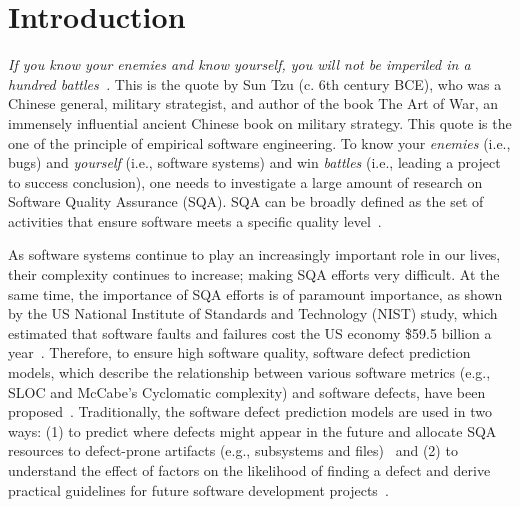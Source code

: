 \section{Introduction}

\emph{If you know your enemies and know yourself, you will not be imperiled in a hundred battles~\cite{WikiquoteSunTzu}.} This is the quote by Sun Tzu (c. 6th century BCE), who was a Chinese general, military strategist, and author of the book The Art of War, an immensely influential ancient Chinese book on military strategy. This quote is the one of the principle of empirical software engineering. To know your \emph{enemies} (i.e., bugs) and \emph{yourself} (i.e., software systems) and win \emph{battles} (i.e., leading a project to success conclusion), one needs to investigate a large amount of research on Software Quality Assurance (SQA). SQA can be broadly defined as the set of activities that ensure software meets a specific quality level~\cite{Fenton1999TSE}.


As software systems continue to play an increasingly important role in our lives, their complexity continues to increase; making SQA efforts very difficult. At the same time, the importance of SQA efforts is of paramount importance, as shown by the US National Institute of Standards and Technology (NIST) study, which estimated that software faults and failures cost the US economy \$59.5 billion a year~\cite{NIST}. Therefore, to ensure high software quality, software defect prediction models, which describe the relationship between various software metrics (e.g., SLOC and McCabe's Cyclomatic complexity) and software defects, have been proposed~\cite{Zimmermann2007,Moser2008ICSE}. Traditionally, the software defect prediction models are used in two ways: (1) to predict where defects might appear in the future and allocate SQA resources to defect-prone artifacts (e.g., subsystems and files)~\cite{Munson1992} and (2) to understand the effect of factors on the likelihood of finding a defect and derive practical guidelines for future software development projects~\cite{Cataldo2009TSE,McIntosh2014MSR}.


